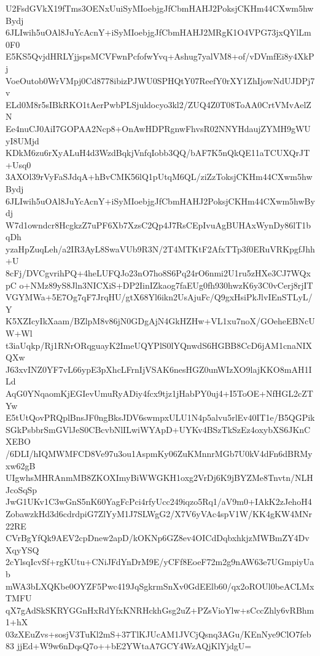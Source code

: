 U2FsdGVkX19fTms3OENxUuiSyMIoebjgJfCbmHAHJ2PoksjCKHm44CXwm5hwBydj
6JLIwih5uOAl8JuYcAcnY+iSyMIoebjgJfCbmHAHJ2MRgK1O4VPG73jxQYlLm0F0
E5KS5QvjdHRLYjjspsMCVFwnPcfofwYvq+Ashug7yalVM8+of/vDVmfEi8y4XkPj
VoeOutob0WrVMpj0Cd8778ibizPJWU0SPHQtY07ReefY0rXY1ZhIjowNdUJDPj7v
ELd0M8r5sIBkRKO1tAerPwbPLSjuldocyo3kl2/ZUQ4Z0T08ToAA0CrtVMvAelZN
Ee4nuCJ0AiI7GOPAA2Ncp8+OnAwHDPRgnwFhvsR02NNYHdaujZYMH9gWUyI8UMjd
KDkM6zu6rXyALuH4d3WzdBqkjVnfqIobb3QQ/bAF7K5nQkQE11aTCUXQrJT+Usq0
3AXOl39rVyFaSJdqA+hBvCMK56lQ1pUtqM6QL/ziZzToksjCKHm44CXwm5hwBydj
6JLIwih5uOAl8JuYcAcnY+iSyMIoebjgJfCbmHAHJ2PoksjCKHm44CXwm5hwBydj
W7d1owndcr8HcgkzZ7uPF6Xb7XzsC2Qp4J7RsCEpIvuAgBUHAxWynDy86lT1bqDh
yzaHpZuqLeh/a2IR3AyL8SwaVUb9R3N/2T4MTKtF2AfxTTp3f0ERuVRKpgfJhh+U
8cFj/DVCgvrihPQ+4heLUFQJo23nO7ho8S6Pq24rO6nmi2U1ru5zHXe3CJ7WQxpC
o+NMz89yS8Jln3NICXiS+DP2IinIZkaog7faEUg0fh930hwzK6y3C0vCerj8rjIT
VGYMWa+5E7Og7qF7JrqHU/gtX68Yl6ikn2UsAjuFc/Q9gxHsiPkJlvIEnSTLyL/Y
K5XZIcyIkXaam/BZlpM8v86jN0GDgAjN4GkHZHw+VL1xu7noX/GOeheEBNcUW+Wl
t3iaUqkp/Rj1RNrORqguayK2ImeUQYPlS0lYQnwdS6HGBB8CcD6jAM1cnaNIXQXw
J63xvINZ0YF7vL66ypE3pXhcLFrnIjVSAK6nesHGZ0unWIzXO9lajKKO8mAH1ILd
AqG0YNqaomKjEGIevUmuRyADiy4fcx9tjz1jHabPY0uj4+I5ToOE+NfHGL2cZTYw
E5tUtQovPRQplBnsJF0ngBksJDV6swmpxULU1N4p5alvu5rlEv40IT1e/B5QGPik
SGkPsbbrSmGVlJeS0CBcvbNlILwiWYApD+UYKv4BSzTkSzEz4oxybXS6JKnCXEBO
/6DLI/hIQMWMFCD8Ve97u3ou1AspmKy06ZuKMnnrMGb7U0kV4dFn6dBRMyxw62gB
UIgwhsMHRAnmMB8ZKOXImyBiWWGKH1oxg2VrDj6K9jBYZMe8Tnvtn/NLHJcoSqSp
JwG1UKv1C3wGnS5nK60YagFcPci4rfyUcc249iqzo5Rq1/aV9m0+IAkK2zJehoH4
ZobawzkHd3d6cdrdpiG7ZlYyM1J7SLWgG2/X7V6yVAc4spV1W/KK4gKW4MNr22RE
CVrBgYfQk9AEV2cpDnew2apD/kOKNp6GZ8ev4OICdDqbxhkjzMWBmZY4DvXqyYSQ
2cYlsqIcvSf+rgKUtu+CNiJFdYnDrM9E/yCFf8EoeF72m2g9nAW63e7UGmpiyUab
mWA3bLXQKbe0OYZF5Pwc419JqSgkrmSnXv0GdEElb60/qx2oROUl0beACLMxTMFU
qX7gAdSkSKRYGGnHxRdYfxKNRHckhGsg2uZ+PZsVioYlw+sCccZhly6vRBhm1+hX
03zXEuZvs+sosjV3TuKl2mS+37TlKJUcAM1JVCjQsnq3AGu/KEnNye9ClO7feb83
jjEd+W9w6nDqsQ7o++bE2YWtaA7GCY4WzAQjKlYjdgU=
